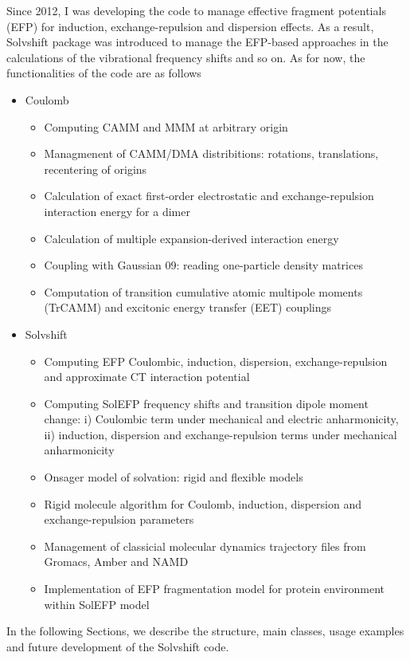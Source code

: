 \documentclass[a4paper,titlepage,twoside,fleqn,12pt]{book}
\begin{document}
\begin{refsection}
Since 2012, I was developing the code to manage effective fragment
potentials (EFP) for induction, exchange\hyp{}repulsion and dispersion
effects. As a result, {\sc Solvshift} package was introduced
to manage the EFP\hyp{}based approaches in the calculations
of the vibrational frequency shifts and so on. As for now, 
the functionalities of the code are as follows
%
\begin{itemize}
 \item {\sc Coulomb}
  \begin{itemize}
  \item Computing CAMM and MMM at arbitrary origin
  \item Managmenent of CAMM/DMA distribitions: rotations, translations, recentering of origins
  \item Calculation of exact first\hyp{}order 
        electrostatic and exchange\hyp{}repulsion interaction energy for a dimer
  \item Calculation of multiple expansion\hyp{}derived interaction energy
  \item Coupling with {\sc Gaussian 09}: reading one\hyp{}particle 
                                        density matrices
  \item Computation of transition cumulative atomic multipole moments (TrCAMM)
        and excitonic energy transfer (EET) couplings~\citep{Blasiak.Maj.Cho.Gora.JCTC.2015}
  \end{itemize}
 \item {\sc Solvshift}
  \begin{itemize}
  \item Computing EFP Coulombic, induction, dispersion, exchange\hyp{}repulsion and approximate CT
        interaction potential
  \item Computing SolEFP frequency shifts and transition dipole moment change:
        i) Coulombic term under mechanical and electric anharmonicity, 
        ii) induction, dispersion and exchange\hyp{}repulsion terms under mechanical anharmonicity
  \item Onsager model of solvation: rigid and flexible models
  \item Rigid molecule algorithm for Coulomb, induction, dispersion and exchange\hyp{}repulsion
        parameters
  \item Management of classicial molecular dynamics trajectory files from Gromacs, Amber and NAMD
  \item Implementation of EFP fragmentation model for protein environment within SolEFP model
  \end{itemize}
\end{itemize}
%
In the following Sections, we describe the structure, main classes,
usage examples and future development of the {\sc Solvshift} code.


\end{refsection}
\end{document}
